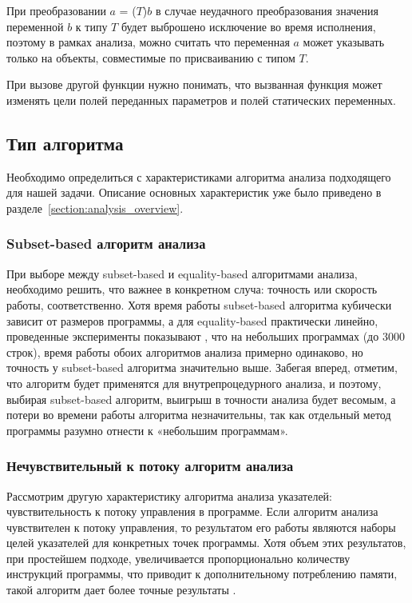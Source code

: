 \documentclass[14pt,titlepage]{extarticle}
\newcommand{\eng}[1]{{\English#1}}
\begin{document}
      При преобразовании $a$ = ($T$)$b$ в случае неудачного преобразования
      значения переменной $b$ к типу $T$ будет выброшено исключение во время
      исполнения, поэтому в рамках анализа, можно считать что переменная $a$
      может указывать только на объекты, совместимые по присваиванию с типом
      $T$.

      При вызове другой функции нужно понимать, что вызванная функция может
      изменять цели полей переданных параметров и полей статических переменных.


    \subsection{Тип алгоритма}

      Необходимо определиться с характеристиками алгоритма анализа
      подходящего для нашей задачи. Описание основных характеристик уже было
      приведено в разделе~\ref{section:analysis_overview}.

    \subsubsection{\eng{Subset-based} алгоритм анализа}

      При выборе между \eng{subset-based} и \eng{equality-based} алгоритмами
      анализа, необходимо решить, что важнее в конкретном случа:
      точность или скорость работы, соответственно.
      Хотя время работы \eng{subset-based} алгоритма кубически зависит от
      размеров программы, а для \eng{equality-based} практически линейно,
      проведенные эксперименты показывают \cite{shapiro_fast_and_accurate}, что
      на небольших программах (до 3000 строк), время работы обоих алгоритмов
      анализа примерно одинаково, но точность у \eng{subset-based} алгоритма
      значительно выше.
      Забегая вперед, отметим, что алгоритм будет применятся для
      внутрепроцедурного анализа, и поэтому, выбирая \eng{subset-based}
      алгоритм, выигрыш в точности анализа будет весомым, а потери во времени
      работы алгоритма незначительны, так как отдельный метод программы
      разумно отнести к «небольшим программам».

    \subsubsection{Нечувствительный к потоку алгоритм анализа}
      \label{section:flow_sensetive_analysis}

      Рассмотрим другую характеристику алгоритма анализа указателей:
      чувствительность к потоку управления в программе.
      Если алгоритм анализа чувствителен к потоку управления, то результатом
      его работы являются наборы целей указателей для конкретных точек
      программы.
      Хотя объем этих результатов, при простейшем подходе, увеличивается
      пропорционально количеству инструкций программы, что приводит к
      дополнительному потреблению памяти, такой алгоритм дает более точные
      результаты \cite[с.~57]{hind_pointer_analysis_not_solved_yet}.
\end{document}
